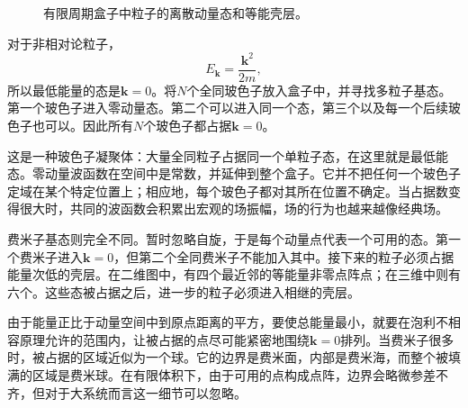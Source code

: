 \begin{figure}
\centering
{}
\caption{有限周期盒子中粒子的离散动量态和等能壳层。}
\end{figure}

对于非相对论粒子，
\begin{equation}
E_{\mathbf{k}}=\frac{\mathbf{k}^2}{2m},
\end{equation}
所以最低能量的态是\(\mathbf{k}=0\)。将\(N\)个全同玻色子放入盒子中，并寻找多粒子基态。第一个玻色子进入零动量态。第二个可以进入同一个态，第三个以及每一个后续玻色子也可以。因此所有\(N\)个玻色子都占据\(\mathbf{k}=0\)。

这是一种玻色子凝聚体：大量全同粒子占据同一个单粒子态，在这里就是最低能态。零动量波函数在空间中是常数，并延伸到整个盒子。它并不把任何一个玻色子定域在某个特定位置上；相应地，每个玻色子都对其所在位置不确定。当占据数变得很大时，共同的波函数会积累出宏观的场振幅，场的行为也越来越像经典场。

费米子基态则完全不同。暂时忽略自旋，于是每个动量点代表一个可用的态。第一个费米子进入\(\mathbf{k}=0\)，但第二个全同费米子不能加入其中。接下来的粒子必须占据能量次低的壳层。在二维图中，有四个最近邻的等能量非零点阵点；在三维中则有六个。这些态被占据之后，进一步的粒子必须进入相继的壳层。

由于能量正比于动量空间中到原点距离的平方，要使总能量最小，就要在泡利不相容原理允许的范围内，让被占据的点尽可能紧密地围绕\(\mathbf{k}=0\)排列。当费米子很多时，被占据的区域近似为一个球。它的边界是费米面，内部是费米海，而整个被填满的区域是费米球。在有限体积下，由于可用的点构成点阵，边界会略微参差不齐，但对于大系统而言这一细节可以忽略。

